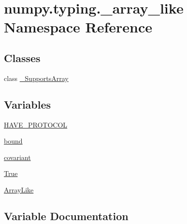 \hypertarget{namespacenumpy_1_1typing_1_1__array__like}{}\section{numpy.\+typing.\+\_\+array\+\_\+like Namespace Reference}
\label{namespacenumpy_1_1typing_1_1__array__like}
\subsection*{Classes}
\begin{DoxyCompactItemize}
\item 
class \hyperlink{classnumpy_1_1typing_1_1__array__like_1_1__SupportsArray}{\+\_\+\+Supports\+Array}
\end{DoxyCompactItemize}
\subsection*{Variables}
\begin{DoxyCompactItemize}
\item 
\hyperlink{namespacenumpy_1_1typing_1_1__array__like_af418e87a430178f763a9ce88db1e872b}{H\+A\+V\+E\+\_\+\+P\+R\+O\+T\+O\+C\+OL}
\item 
\hyperlink{namespacenumpy_1_1typing_1_1__array__like_a10c358d1450907e59960a1c740a243c9}{bound}
\item 
\hyperlink{namespacenumpy_1_1typing_1_1__array__like_af37163c29ab4e5f3ca436e2bf22149cf}{covariant}
\item 
\hyperlink{namespacenumpy_1_1typing_1_1__array__like_a9fa40650be33e648df2a2dd27ff6e03e}{True}
\item 
\hyperlink{namespacenumpy_1_1typing_1_1__array__like_af156f79c961821f12c4d48549847b0f8}{Array\+Like}
\end{DoxyCompactItemize}


\subsection{Variable Documentation}
\mbox{\label{namespacenumpy_1_1typing_1_1__array__like_af156f79c961821f12c4d48549847b0f8}} 
